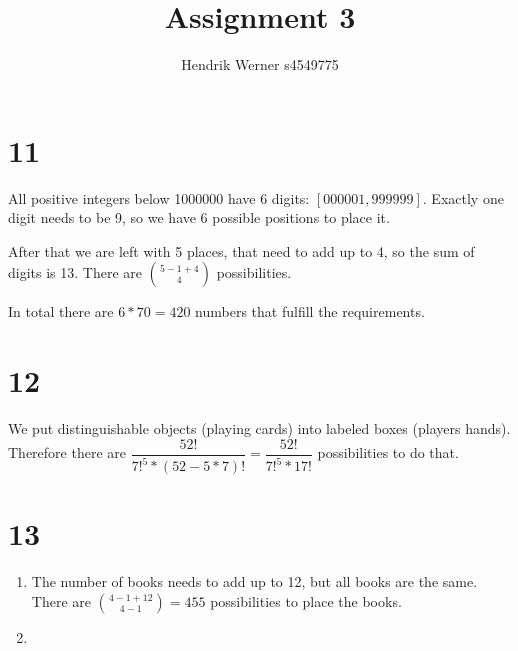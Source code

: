 \documentclass[12pt]{article}
\title{Assignment 3}
\author{
	Hendrik Werner s4549775
}
\begin{document}
\maketitle

\section*{11}
All positive integers below 1000000 have 6 digits: $[000001, 999999]$. Exactly one digit needs to be 9, so we have 6 possible positions to place it.

After that we are left with 5 places, that need to add up to 4, so the sum of digits is 13. There are $\binom{5 - 1 + 4}{4}$ possibilities.

In total there are $6 * 70 = 420$ numbers that fulfill the requirements.

\section*{12}
We put distinguishable objects (playing cards) into labeled boxes (players hands). Therefore there are $\dfrac{52!}{7!^5 * (52 - 5 * 7)!} =  \dfrac{52!}{7!^5 * 17!}$ possibilities to do that.

\section*{13}
\begin{enumerate}[a]
	\item %
	The number of books needs to add up to 12, but all books are the same. There are $\binom{4 - 1 + 12}{4 - 1} = 455$ possibilities to place the books.

	\item %
\end{enumerate}
\end{document}

